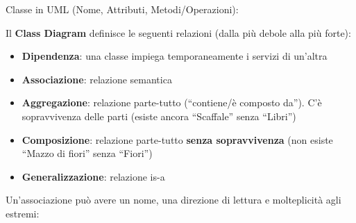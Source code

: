 \documentclass[12pt]{extarticle}
\newcommand{\cn}[1]{\makebox[\linewidth][c]{\textbf{#1}}}
\begin{document}
\noindent Classe in UML (Nome, Attributi, Metodi/Operazioni):
\begin{figure}[htbp]
    \centering
{}
    \label{fig:uml_class_box_example}
\end{figure}

\noindent Il \textbf{Class Diagram} definisce le seguenti relazioni (dalla più debole alla più forte):
\begin{itemize}
    \item \textbf{Dipendenza}: una classe impiega temporaneamente i servizi di un'altra
    \item \textbf{Associazione}: relazione semantica
    \item \textbf{Aggregazione}: relazione parte-tutto (``contiene/è composto da''). C'è sopravvivenza delle parti (esiste ancora ``Scaffale'' senza ``Libri'')
    \item \textbf{Composizione}: relazione parte-tutto \textbf{senza sopravvivenza} (non esiste ``Mazzo di fiori'' senza ``Fiori'')
    \item \textbf{Generalizzazione}: relazione is-a
\end{itemize}
Un'associazione può avere un nome, una direzione di lettura e molteplicità agli estremi:
\begin{figure}[htbp]
    \centering
{}
    \label{fig:association_order_customer}
\end{figure}
\end{document}
